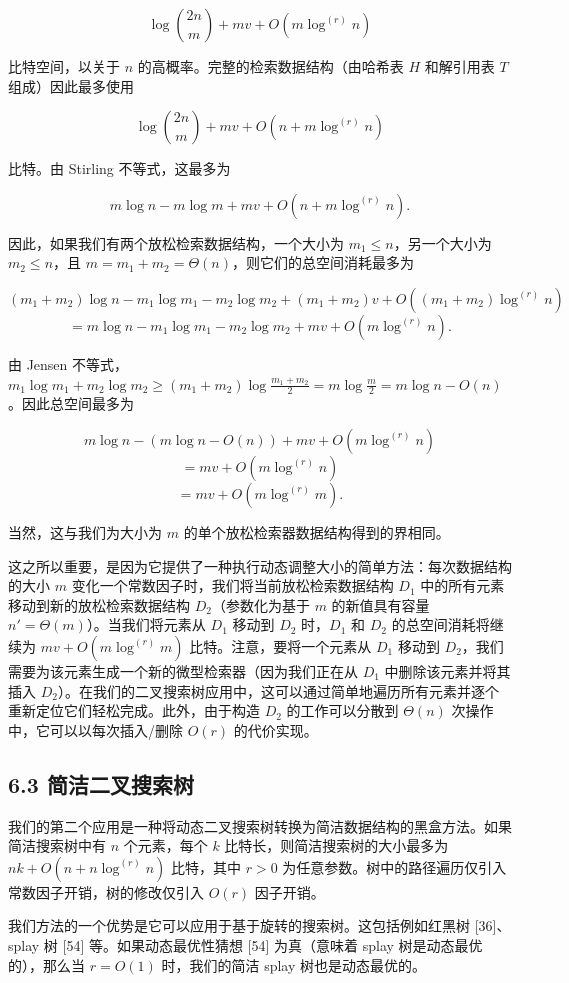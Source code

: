 \documentclass[12pt,a4paper]{ctexart}
\theoremstyle{remark}
\begin{document}
$$\log\binom{2n}{m}+mv+O(m\log^{(r)}n)$$

比特空间，以关于 $n$ 的高概率。完整的检索数据结构（由哈希表 $H$ 和解引用表 $T$ 组成）因此最多使用

$$\log\binom{2n}{m}+mv+O(n+m\log^{(r)}n)$$

比特。由 Stirling 不等式，这最多为

$$m\log n-m\log m+mv+O(n+m\log^{(r)}n).$$

因此，如果我们有两个放松检索数据结构，一个大小为 $m_1\leq n$，另一个大小为 $m_2\leq n$，且 $m=m_1+m_2=\Theta(n)$，则它们的总空间消耗最多为

$$(m_1+m_2)\log n-m_1\log m_1-m_2\log m_2+(m_1+m_2)v+O((m_1+m_2)\log^{(r)}n)$$
$$=m\log n-m_1\log m_1-m_2\log m_2+mv+O(m\log^{(r)}n).$$

由 Jensen 不等式，$m_1\log m_1+m_2\log m_2\geq (m_1+m_2)\log\frac{m_1+m_2}{2}=m\log\frac{m}{2}=m\log n-O(n)$。因此总空间最多为

$$m\log n-(m\log n-O(n))+mv+O(m\log^{(r)}n)$$
$$=mv+O(m\log^{(r)}n)$$
$$=mv+O(m\log^{(r)}m).$$

当然，这与我们为大小为 $m$ 的单个放松检索器数据结构得到的界相同。

这之所以重要，是因为它提供了一种执行动态调整大小的简单方法：每次数据结构的大小 $m$ 变化一个常数因子时，我们将当前放松检索数据结构 $D_1$ 中的所有元素移动到新的放松检索数据结构 $D_2$（参数化为基于 $m$ 的新值具有容量 $n'=\Theta(m)$）。当我们将元素从 $D_1$ 移动到 $D_2$ 时，$D_1$ 和 $D_2$ 的总空间消耗将继续为 $mv+O(m\log^{(r)}m)$ 比特。注意，要将一个元素从 $D_1$ 移动到 $D_2$，我们需要为该元素生成一个新的微型检索器（因为我们正在从 $D_1$ 中删除该元素并将其插入 $D_2$）。在我们的二叉搜索树应用中，这可以通过简单地遍历所有元素并逐个重新定位它们轻松完成。此外，由于构造 $D_2$ 的工作可以分散到 $\Theta(n)$ 次操作中，它可以以每次插入/删除 $O(r)$ 的代价实现。

\subsection{6.3 简洁二叉搜索树}
我们的第二个应用是一种将动态二叉搜索树转换为简洁数据结构的黑盒方法。如果简洁搜索树中有 $n$ 个元素，每个 $k$ 比特长，则简洁搜索树的大小最多为 $nk+O(n+n\log^{(r)}n)$ 比特，其中 $r>0$ 为任意参数。树中的路径遍历仅引入常数因子开销，树的修改仅引入 $O(r)$ 因子开销。

我们方法的一个优势是它可以应用于基于旋转的搜索树。这包括例如红黑树 [36]、splay 树 [54] 等。如果动态最优性猜想 [54] 为真（意味着 splay 树是动态最优的），那么当 $r=O(1)$ 时，我们的简洁 splay 树也是动态最优的。
\end{document}
